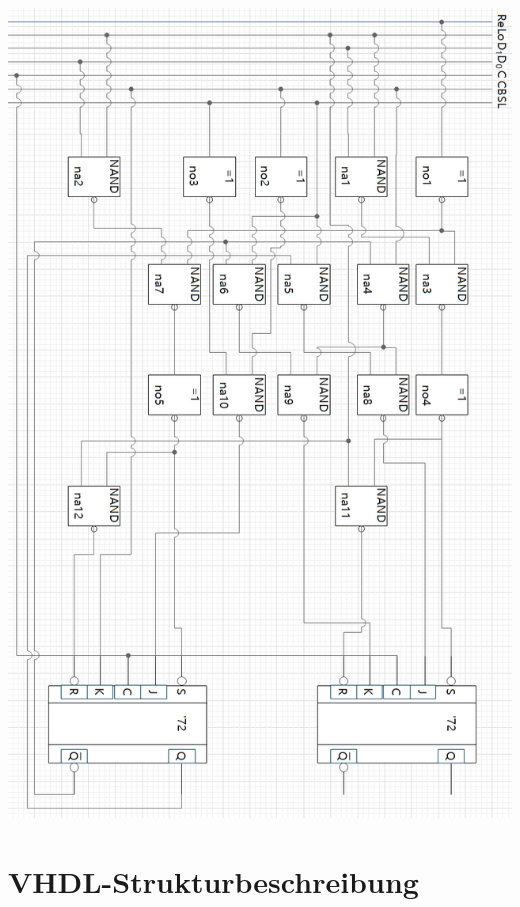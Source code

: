 \documentclass[fleqn]{article}
\begin{document}
\begin{center}
        \includegraphics[scale=0.6]{bild1.png}
\end{center}

\section{VHDL-Strukturbeschreibung}
\end{document}
